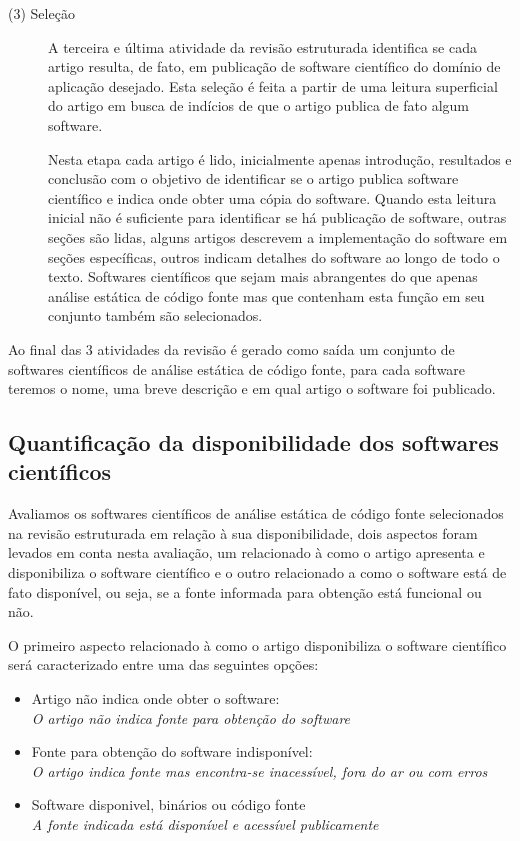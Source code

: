 \begin{description}
  \item[(3) Seleção]
    A terceira e última atividade da revisão estruturada identifica se cada
    artigo resulta, de fato, em publicação de software científico do domínio de
    aplicação desejado. Esta seleção é feita a partir de uma leitura
    superficial do artigo em busca de indícios de que o artigo publica de fato
    algum software.

    Nesta etapa cada artigo é lido, inicialmente apenas introdução, resultados
    e conclusão com o objetivo de identificar se o artigo publica software
    científico e indica onde obter uma cópia do software. Quando esta leitura inicial
    não é suficiente para identificar se há publicação de software, outras seções são
    lidas, alguns artigos descrevem a implementação do software em seções específicas,
    outros indicam detalhes do software ao longo de todo o texto. Softwares científicos
    que sejam mais abrangentes do que apenas análise estática de código fonte
    mas que contenham esta função em seu conjunto também são selecionados.

\end{description}

Ao final das 3 atividades da revisão é gerado como saída um conjunto de
softwares científicos de análise estática de código fonte, para cada software
teremos o nome, uma breve descrição e em qual artigo o software foi publicado.

\subsection{Quantificação da disponibilidade dos softwares científicos}

Avaliamos os softwares científicos de análise estática de código fonte
selecionados na revisão estruturada em relação à sua disponibilidade, dois
aspectos foram levados em conta nesta avaliação, um relacionado à como o artigo
apresenta e disponibiliza o software científico e o outro relacionado a como o
software está de fato disponível, ou seja, se a fonte informada para obtenção
está funcional ou não.

O primeiro aspecto relacionado à como o artigo disponibiliza o software
científico será caracterizado entre uma das seguintes opções:

\begin{itemize}
  \item Artigo não indica onde obter o software:\\
    {\it O artigo não indica fonte para obtenção do software}
  \item Fonte para obtenção do software indisponível:\\
    {\it O artigo indica fonte mas encontra-se inacessível, fora do ar ou com erros}
  \item Software disponivel, binários ou código fonte\\
    {\it A fonte indicada está disponível e acessível publicamente}
\end{itemize}

